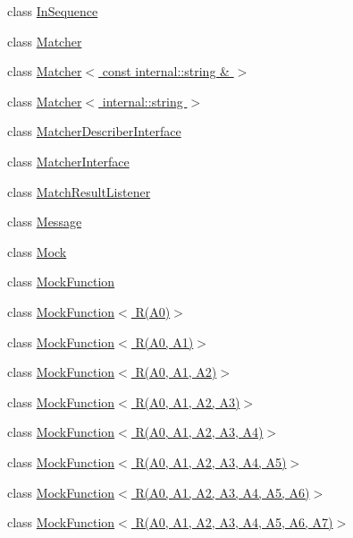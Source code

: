 \begin{DoxyCompactItemize}
\item 
class \hyperlink{classtesting_1_1_in_sequence}{In\+Sequence}
\item 
class \hyperlink{classtesting_1_1_matcher}{Matcher}
\item 
class \hyperlink{classtesting_1_1_matcher_3_01const_01internal_1_1string_01_6_01_4}{Matcher$<$ const internal\+::string \& $>$}
\item 
class \hyperlink{classtesting_1_1_matcher_3_01internal_1_1string_01_4}{Matcher$<$ internal\+::string $>$}
\item 
class \hyperlink{classtesting_1_1_matcher_describer_interface}{Matcher\+Describer\+Interface}
\item 
class \hyperlink{classtesting_1_1_matcher_interface}{Matcher\+Interface}
\item 
class \hyperlink{classtesting_1_1_match_result_listener}{Match\+Result\+Listener}
\item 
class \hyperlink{classtesting_1_1_message}{Message}
\item 
class \hyperlink{classtesting_1_1_mock}{Mock}
\item 
class \hyperlink{classtesting_1_1_mock_function}{Mock\+Function}
\item 
class \hyperlink{classtesting_1_1_mock_function_3_01_r_07_a0_08_4}{Mock\+Function$<$ R(\+A0)$>$}
\item 
class \hyperlink{classtesting_1_1_mock_function_3_01_r_07_a0_00_01_a1_08_4}{Mock\+Function$<$ R(\+A0, A1)$>$}
\item 
class \hyperlink{classtesting_1_1_mock_function_3_01_r_07_a0_00_01_a1_00_01_a2_08_4}{Mock\+Function$<$ R(\+A0, A1, A2)$>$}
\item 
class \hyperlink{classtesting_1_1_mock_function_3_01_r_07_a0_00_01_a1_00_01_a2_00_01_a3_08_4}{Mock\+Function$<$ R(\+A0, A1, A2, A3)$>$}
\item 
class \hyperlink{classtesting_1_1_mock_function_3_01_r_07_a0_00_01_a1_00_01_a2_00_01_a3_00_01_a4_08_4}{Mock\+Function$<$ R(\+A0, A1, A2, A3, A4)$>$}
\item 
class \hyperlink{classtesting_1_1_mock_function_3_01_r_07_a0_00_01_a1_00_01_a2_00_01_a3_00_01_a4_00_01_a5_08_4}{Mock\+Function$<$ R(\+A0, A1, A2, A3, A4, A5)$>$}
\item 
class \hyperlink{classtesting_1_1_mock_function_3_01_r_07_a0_00_01_a1_00_01_a2_00_01_a3_00_01_a4_00_01_a5_00_01_a6_08_4}{Mock\+Function$<$ R(\+A0, A1, A2, A3, A4, A5, A6)$>$}
\item 
class \hyperlink{classtesting_1_1_mock_function_3_01_r_07_a0_00_01_a1_00_01_a2_00_01_a3_00_01_a4_00_01_a5_00_01_a6_00_01_a7_08_4}{Mock\+Function$<$ R(\+A0, A1, A2, A3, A4, A5, A6, A7)$>$}

\end{DoxyCompactItemize}
